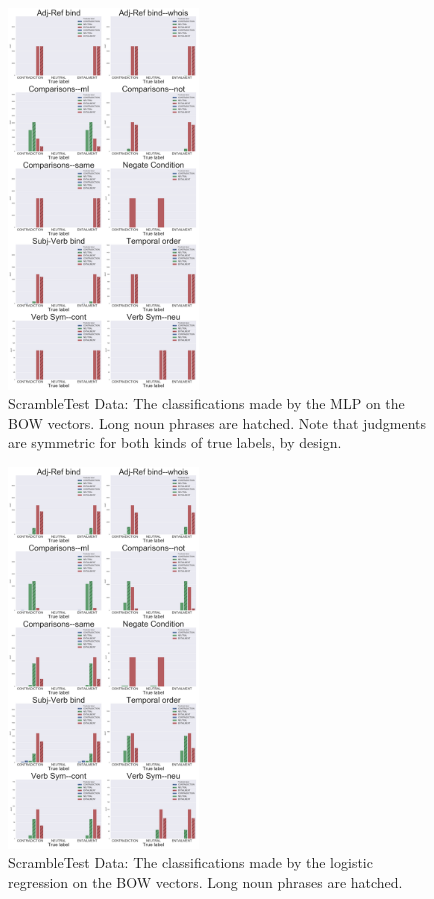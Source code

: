 \documentclass[10pt,letterpaper]{article}
\begin{document}
\begin{figure}[ht!]
\centering
\includegraphics[width=0.45\textwidth]{AllHistsBOWMLP.png}
\caption{ScrambleTest Data: The classifications made by the MLP on the BOW vectors. Long noun phrases are hatched. Note that judgments are symmetric for both kinds of true labels, by design.}
\label{fig:BOWhistMLP}
\end{figure}



\begin{figure}[ht!]
\centering
\includegraphics[width=0.45\textwidth]{AllHistsBOWLogReg.png}
\caption{ScrambleTest Data: The classifications made by the logistic regression on the BOW vectors. Long noun phrases are hatched.}
\label{fig:BOWhistLR}
\end{figure}
\end{document}
